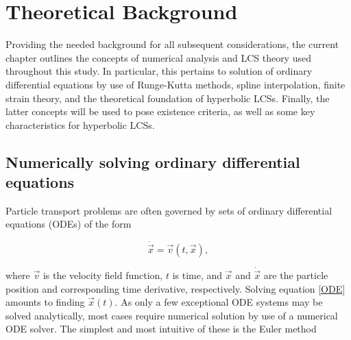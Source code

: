 \chapter[Theoretical Background]{Theoretical Background} \label{ch:Theory}

Providing the needed background for all subsequent considerations, the current chapter outlines the concepts of numerical analysis and LCS theory used throughout this study. In particular, this pertains to solution of ordinary differential equations by use of Runge-Kutta methods, spline interpolation, finite strain theory, and the theoretical foundation of hyperbolic LCSs. Finally, the latter concepts will be used to pose existence criteria, as well as some key characteristics for hyperbolic LCSs.

\section{Numerically solving ordinary differential equations}\label{sec:ODEs}


Particle transport problems are often governed by sets of ordinary differential equations (ODEs) of the form

\begin{equation}\label{ODE}
	\dot{\vec{x}} = \vec{v}(t,\vec{x}),
\end{equation}

\noindent where $\vec{v}$ is the velocity field function, $t$ is time, and $\vec{x}$ and $\dot{\vec{x}}$ are the particle position and corresponding time derivative, respectively. Solving equation \eqref{ODE} amounts to finding $\vec{x}(t)$. As only a few exceptional ODE systems may be solved analytically, most cases require  numerical solution by use of a numerical ODE solver. The simplest and most intuitive of these is the Euler method

